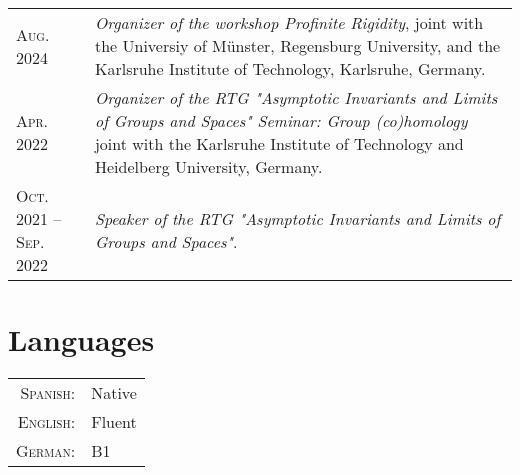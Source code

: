 \documentclass[a4paper,11pt]{article} %
\begin{document}
\begin{longtable}{>{\raggedleft\arraybackslash}p{4.2cm}p{10cm}}

    \textsc{Aug. 2024} & \emph{Organizer of the workshop Profinite Rigidity}, joint with the Universiy of Münster, Regensburg University, and the Karlsruhe Institute of Technology, Karlsruhe, Germany.\\

    \textsc{Apr. 2022} & \emph{Organizer of the RTG "Asymptotic Invariants and Limits of Groups and Spaces"
    Seminar: Group (co)homology} joint with the Karlsruhe Institute of Technology and Heidelberg University, Germany.\\

    \textsc{Oct. 2021 -- Sep. 2022} & \emph{Speaker of the RTG "Asymptotic Invariants and Limits of Groups and Spaces"}.\\

\end{longtable}


\section{Languages}

\begin{tabular}{rl}
\textsc{Spanish:} & Native\\

\textsc{English:} & Fluent\\

\textsc{German:} & B1\\
\end{tabular}
\end{document}
